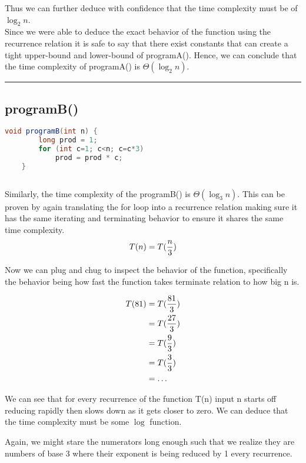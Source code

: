 Thus we can further deduce with confidence that the time complexity must be of $\log_2n$.\\ 
Since we were able to deduce the exact behavior of the function using the recurrence relation it is safe to say that there exist constants that can create a tight upper-bound and lower-bound of programA(). Hence, we can conclude that the time complexity of programA() is $\Theta(\log_2n)$.

\vspace*{8pt}
\hrule
\vspace*{8pt}


\subsection*{programB()}

\begin{lstlisting}[language=Java] 
    void programB(int n) {
        long prod = 1;
        for (int c=1; c<n; c=c*3)
            prod = prod * c;
    }
    
\end{lstlisting}

Similarly, the time complexity of the programB() is $\Theta(\log_3n)$. This can be proven by again translating the for loop into a recurrence relation making sure it has the same iterating and terminating behavior to ensure it shares the same time complexity.
$$
T(n) = T( {n \over 3    } )
$$

Now we can plug and chug to inspect the behavior of the function, specifically the behavior being how fast the function takes terminate relation to how big n is.

\begin{align*}
T(81) &= T( {81 \over 3} ) \\
&= T( {27 \over 3} ) \\
&= T( {9 \over 3} ) \\
&= T( {3 \over 3} ) \\
&= \ldots  \\
\end{align*}

We can see that for every recurrence of the function T(n) input n starts off reducing rapidly then slows down as it gets closer to zero. We can deduce that the time complexity must be some $\log$ function.

\pagebreak

Again, we might stare the numerators long enough such that we realize they are numbers of base 3 where their exponent is being reduced by 1 every recurrence.

